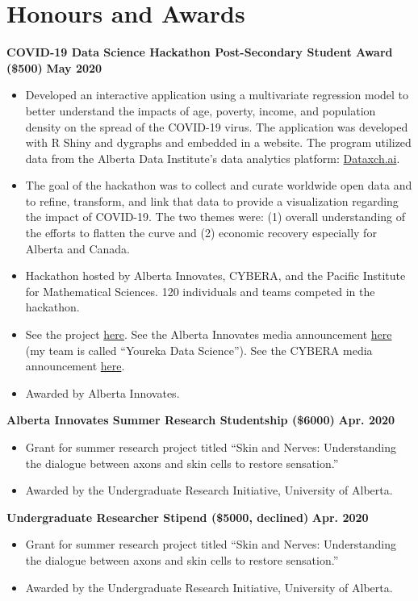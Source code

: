 \documentclass{article}
\begin{document}
\section*{Honours and Awards}
\textbf{COVID-19 Data Science Hackathon Post-Secondary Student Award (\$500)} \hfill \textbf{May 2020}
\begin{itemize}
    \item Developed an interactive application using a multivariate regression model to better understand the impacts of age, poverty, income, and population density on the spread of the COVID-19 virus. The application was developed with R Shiny and dygraphs and embedded in a website. The program utilized data from the Alberta Data Institute's data analytics platform: \href{https://dataxch.ai}{Dataxch.ai}.
    \item The goal of the hackathon was to collect and curate worldwide open data and to refine, transform, and link that data to provide a visualization regarding the impact of COVID-19. The two themes were: (1) overall understanding of the efforts to flatten the curve and (2) economic recovery especially for Alberta and Canada.
    \item Hackathon hosted by Alberta Innovates, CYBERA, and the Pacific Institute for Mathematical Sciences. 120 individuals and teams competed in the hackathon.
    \item See the project \href{https://yourekacanada.org/index}{here}. See the Alberta Innovates media announcement \href{https://albertainnovates.ca/impact/newsroom/flattening-the-curve-and-promoting-economic-recovery-through-innovation}{here} (my team is called ``Youreka Data Science''). See the CYBERA media announcement \href{https://www.cybera.ca/news-and-events/news/covid-19-data-science-hackathon-winners/}{here}.
    \item Awarded by Alberta Innovates.
\end{itemize}
\textbf{Alberta Innovates Summer Research Studentship (\$6000)} \hfill \textbf{Apr. 2020}
\begin{itemize}
    \item Grant for summer research project titled ``Skin and Nerves: Understanding the dialogue between axons and skin cells to restore sensation.''
    \item Awarded by the Undergraduate Research Initiative, University of Alberta.
\end{itemize}
\textbf{Undergraduate Researcher Stipend (\$5000, declined)} \hfill \textbf{Apr. 2020}
\begin{itemize}
    \item Grant for summer research project titled ``Skin and Nerves: Understanding the dialogue between axons and skin cells to restore sensation.''
    \item Awarded by the Undergraduate Research Initiative, University of Alberta.
\end{itemize}
\end{document}

